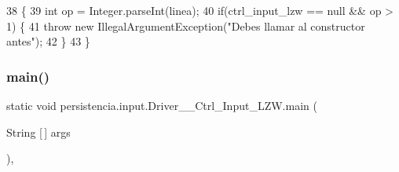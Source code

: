 \begin{DoxyCode}
38                                                                                         \{
39         \textcolor{keywordtype}{int} op = Integer.parseInt(linea);
40         \textcolor{keywordflow}{if}(ctrl\_input\_lzw == null && op > 1) \{
41             \textcolor{keywordflow}{throw} \textcolor{keyword}{new} IllegalArgumentException(\textcolor{stringliteral}{"Debes llamar al constructor antes"});
42         \}
43     \}
\end{DoxyCode}
\mbox{\label{classpersistencia_1_1input_1_1Driver____Ctrl__Input__LZW_a157252ceaf7ec257685654b5ad78049f}} 
\subsubsection{\texorpdfstring{main()}{main()}}
{\footnotesize\ttfamily static void persistencia.\+input.\+Driver\+\_\+\+\_\+\+Ctrl\+\_\+\+Input\+\_\+\+L\+Z\+W.\+main (\begin{DoxyParamCaption}\item[{String \mbox{[}$\,$\mbox{]}}]{args }\end{DoxyParamCaption})\hspace{0.3cm}{\ttfamily [inline]}, {\ttfamily [static]}}


